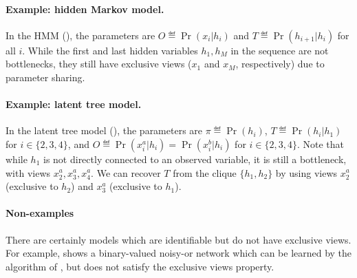 \paragraph{Example: hidden Markov model.}

In the HMM (), the parameters
are $O \eqdef \Pr(x_i|h_i)$ and $T \eqdef \Pr(h_{i+1} | h_i)$
for all $i$.
While the first and last hidden variables $h_1, h_M$ in the
  sequence are not bottlenecks, they still have exclusive views ($x_1$ and
  $x_M$, respectively)
  due to parameter sharing.

\paragraph{Example: latent tree model.}

In the latent tree model (), the parameters
are $\pi \eqdef \Pr(h_i)$, $T \eqdef \Pr(h_i | h_1)$ for $i \in \{2,3,4\}$,
and $O \eqdef \Pr(x^a_i | h_i) = \Pr(x^b_i | h_i)$ for $i \in \{2,3,4\}$.
Note that while $h_1$ is not directly connected to an observed variable,
  it is still a bottleneck, with views $x^a_2, x^a_3, x^a_4$.
We can recover $T$ from the clique $\{h_1, h_2\}$ by using views $x^a_2$
  (exclusive to $h_2$) and $x^a_3$ (exclusive to $h_1$).

\paragraph{Non-examples}
\label{sec:non-example}

There are certainly models which are identifiable but do not have exclusive views.
For example,  shows
  a binary-valued noisy-or network which can be
  learned by the algorithm of \citet{halpern13noisyor},
  but does not satisfy the exclusive views property.
